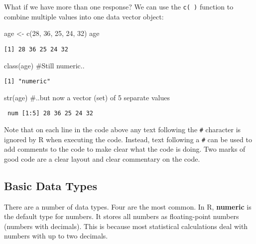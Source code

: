 \documentclass[
  letterpaper,
  krantz2]{style/krantz}
\newenvironment{Shaded}{\begin{snugshade}}{\end{snugshade}}
\newcommand{\CommentTok}[1]{\textcolor[rgb]{0.37,0.37,0.37}{#1}}
\newcommand{\DecValTok}[1]{\textcolor[rgb]{0.68,0.00,0.00}{#1}}
\newcommand{\FunctionTok}[1]{\textcolor[rgb]{0.28,0.35,0.67}{#1}}
\newcommand{\NormalTok}[1]{\textcolor[rgb]{0.00,0.23,0.31}{#1}}
\newcommand{\OtherTok}[1]{\textcolor[rgb]{0.00,0.23,0.31}{#1}}
\begin{document}
What if we have more than one response? We can use the \texttt{c(\ )}
function to combine multiple values into one data vector object:

\begin{Shaded}
\begin{Highlighting}[]
\NormalTok{age }\OtherTok{\textless{}{-}} \FunctionTok{c}\NormalTok{(}\DecValTok{28}\NormalTok{, }\DecValTok{36}\NormalTok{, }\DecValTok{25}\NormalTok{, }\DecValTok{24}\NormalTok{, }\DecValTok{32}\NormalTok{)}
\NormalTok{age}
\end{Highlighting}
\end{Shaded}

\begin{verbatim}
[1] 28 36 25 24 32
\end{verbatim}

\begin{Shaded}
\begin{Highlighting}[]
\FunctionTok{class}\NormalTok{(age) }\CommentTok{\#Still numeric..}
\end{Highlighting}
\end{Shaded}

\begin{verbatim}
[1] "numeric"
\end{verbatim}

\begin{Shaded}
\begin{Highlighting}[]
\FunctionTok{str}\NormalTok{(age) }\CommentTok{\#..but now a vector (set) of 5 separate values}
\end{Highlighting}
\end{Shaded}

\begin{verbatim}
 num [1:5] 28 36 25 24 32
\end{verbatim}

Note that on each line in the code above any text following the
\texttt{\#} character is ignored by R when executing the code. Instead,
text following a \texttt{\#} can be used to add comments to the code to
make clear what the code is doing. Two marks of good code are a clear
layout and clear commentary on the code.

\hypertarget{basic-data-types}{%
\subsection{Basic Data Types}\label{basic-data-types}}

There are a number of data types. Four are the most common. In R,
\textbf{numeric} is the default type for numbers. It stores all numbers
as floating-point numbers (numbers with decimals). This is because most
statistical calculations deal with numbers with up to two decimals.
\end{document}

